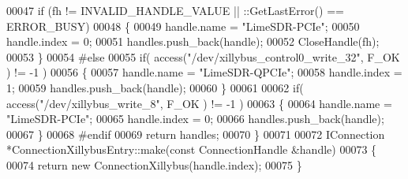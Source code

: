 \begin{DoxyCode}
00047     \textcolor{keywordflow}{if} (fh != INVALID\_HANDLE\_VALUE || ::GetLastError() == ERROR\_BUSY)
00048     \{
00049         handle.name = \textcolor{stringliteral}{"LimeSDR-PCIe"};
00050         handle.index = 0;
00051         handles.push\_back(handle);
00052         CloseHandle(fh);
00053     \}
00054 \textcolor{preprocessor}{#else}
00055     \textcolor{keywordflow}{if}( access(\textcolor{stringliteral}{"/dev/xillybus\_control0\_write\_32"}, F\_OK ) != -1 )
00056     \{
00057         handle.name = \textcolor{stringliteral}{"LimeSDR-QPCIe"};
00058         handle.index = 1;
00059         handles.push\_back(handle);
00060     \}
00061 
00062     \textcolor{keywordflow}{if}( access(\textcolor{stringliteral}{"/dev/xillybus\_write\_8"}, F\_OK ) != -1 )
00063     \{
00064         handle.name = \textcolor{stringliteral}{"LimeSDR-PCIe"};
00065         handle.index = 0;
00066         handles.push\_back(handle);
00067     \}
00068 \textcolor{preprocessor}{#endif}
00069     \textcolor{keywordflow}{return} handles;
00070 \}
00071 
00072 IConnection *ConnectionXillybusEntry::make(\textcolor{keyword}{const} ConnectionHandle &handle)
00073 \{
00074     \textcolor{keywordflow}{return} \textcolor{keyword}{new} ConnectionXillybus(handle.index);
00075 \}
\end{DoxyCode}
